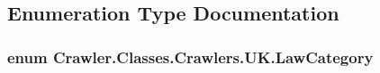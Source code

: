 \subsection{Enumeration Type Documentation}
\hypertarget{namespace_crawler_1_1_classes_1_1_crawlers_1_1_u_k_a7c4a9f7b6f43c069b2c1d1ece0bb8355}{
\subsubsection[{Law\-Category}]{\setlength{\rightskip}{0pt plus 5cm}enum {\bf Crawler.\-Classes.\-Crawlers.\-U\-K.\-Law\-Category}}}\label{namespace_crawler_1_1_classes_1_1_crawlers_1_1_u_k_a7c4a9f7b6f43c069b2c1d1ece0bb8355}
